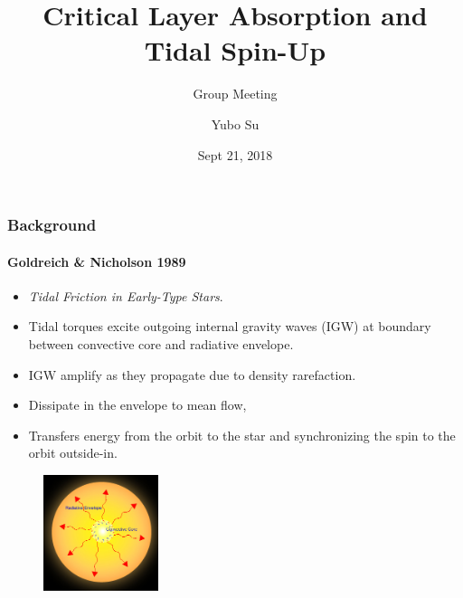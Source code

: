 \documentclass[dvipsnames]{beamer}
\begin{document}
\title{Critical Layer Absorption and Tidal Spin-Up}
\subtitle{Group Meeting}
\author{Yubo Su}
\date{Sept 21, 2018}

\maketitle

\begin{frame}
    \frametitle{Background}
    \framesubtitle{Goldreich \& Nicholson 1989}

    \begin{itemize}
        \item \emph{Tidal Friction in Early-Type Stars}.

        \item Tidal torques excite outgoing internal gravity waves (IGW) at
            boundary between convective core and radiative envelope.

        \item IGW amplify as they propagate due to density rarefaction.

        \item Dissipate in the envelope to mean flow,

        \item Transfers energy from the orbit to the star and synchronizing the
            spin to the orbit outside-in.
    \end{itemize}
    \begin{figure}[t]
        \centering
        \includegraphics[width=0.3\textwidth]{conv_core.jpg}
    \end{figure}
\end{frame}
\end{document}
